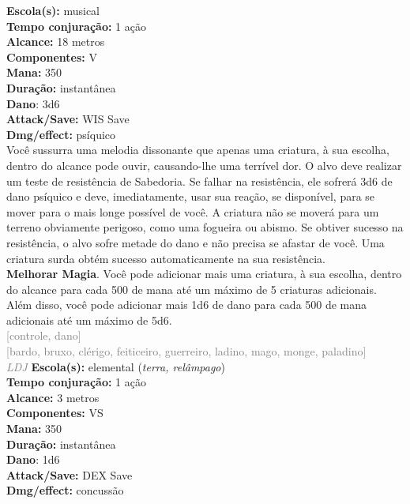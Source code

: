 \documentclass{RPG_Adventure}[2021/10/20]
\begin{document}
{\small \t \textbf{Escola(s):} musical\\\t \textbf{Tempo conjuração:} 1 ação\\\t \textbf{Alcance:} 18 metros\\\t \textbf{Componentes:} V\\\t \textbf{Mana:} 350\\\t \textbf{Duração:} instantânea\\\t \textbf{Dano}: 3d6\\\t \textbf{Attack/Save:} WIS Save\\\t \textbf{Dmg/effect:} psíquico\\}
{\normalsize Você sussurra uma melodia dissonante que apenas uma criatura, à sua escolha, dentro do alcance pode ouvir, causando-lhe uma terrível dor. O alvo deve realizar um teste de resistência de Sabedoria. Se falhar na resistência, ele sofrerá 3d6 de dano psíquico e deve, imediatamente, usar sua reação, se disponível, para se mover para o mais longe possível de você. A criatura não se moverá para um terreno obviamente perigoso, como uma fogueira ou abismo. Se obtiver sucesso na resistência, o alvo sofre metade do dano e não precisa se afastar de você. Uma criatura surda obtém sucesso automaticamente na sua resistência.\\\t \textbf{Melhorar Magia}. Você pode adicionar mais uma criatura, à sua escolha, dentro do alcance para cada 500 de mana até um máximo de 5 criaturas adicionais. Além disso, você pode adicionar mais 1d6 de dano para cada 500 de mana adicionais até um máximo de 5d6.\\}
{\scriptsize \textcolor{gray}{[controle, dano]\\}}
{\scriptsize \textcolor{gray}{[bardo, bruxo, clérigo, feiticeiro, guerreiro, ladino, mago, monge, paladino]\\}}
{\tiny \textcolor{gray}{\textit{LDJ}}}
{\small \t \textbf{Escola(s):} elemental (\textit{terra, relâmpago})\\\t \textbf{Tempo conjuração:} 1 ação\\\t \textbf{Alcance:} 3 metros\\\t \textbf{Componentes:} VS\\\t \textbf{Mana:} 350\\\t \textbf{Duração:} instantânea\\\t \textbf{Dano}: 1d6\\\t \textbf{Attack/Save:} DEX Save\\\t \textbf{Dmg/effect:} concussão\\}
\end{document}
